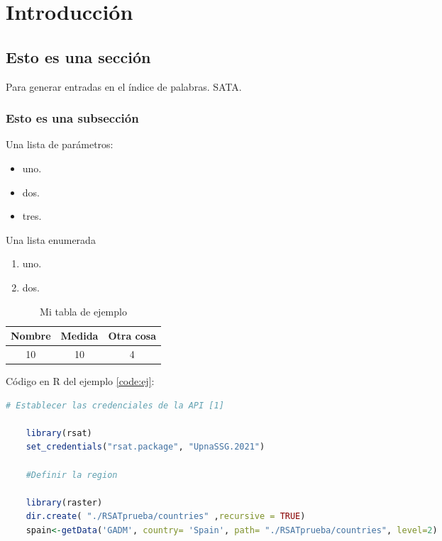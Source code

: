 \chapter[Introducción]{Introducción}
\label{Chap1}

\section{Esto es una sección}

Para generar entradas en el índice de palabras. SATA.

\subsection{Esto es una subsección}
Una lista de parámetros: %
	\begin{itemize}
		\item uno.
		\item dos.
		\item tres.
	\end{itemize}
	Una lista enumerada
	\begin{enumerate}
		\item  uno.
		\item  dos.
	\end{enumerate}
\begin{table}[H]\caption{Mi tabla de ejemplo}\label{tab:ej}
\begin{center}
	\begin{tabular}{c c c}
		Nombre & Medida & Otra cosa\\
		\hline
		10 & 10 & 4\\
	\end{tabular}
\end{center}
\end{table}


Código en R del ejemplo \ref{code:ej}:
\begin{lstlisting}[language=R, caption=pie de código,label=code:ej]
	# Establecer las credenciales de la API [1]
	
	library(rsat)
	set_credentials("rsat.package", "UpnaSSG.2021")
	
	#Definir la region
	
	library(raster)
	dir.create( "./RSATprueba/countries" ,recursive = TRUE)
	spain<-getData('GADM', country= 'Spain', path= "./RSATprueba/countries", level=2)
	
\end{lstlisting}


